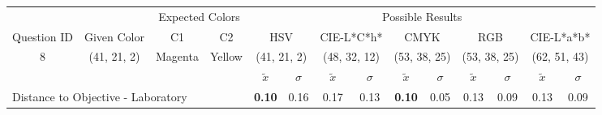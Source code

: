 \begin{table}[H]
  \resizebox{\textwidth}{!} {
  \begin{tabular}{lccccccccccccc}
    \hline
    \multicolumn{1}{c}{}                              &                                      & \multicolumn{2}{c}{Expected Colors}                   & \multicolumn{10}{c}{Possible Results}                                                                                                                                                                                                                                                                                        \\ \cline{3-14}
    \multicolumn{1}{c}{\multirow{-2}{*}{Question ID}} & \multirow{-2}{*}{Given Color}        & C1                       & C2                         & \multicolumn{2}{c}{HSV}                                        & \multicolumn{2}{c}{CIE-L*C*h*}                                 & \multicolumn{2}{c}{CMYK}                                       & \multicolumn{2}{c}{RGB}                                        & \multicolumn{2}{c}{CIE-L*a*b*}                                 \\ \hline
    \multicolumn{1}{c}{8}                             & \cellcolor[HTML]{FF0000}(41, 21, 2) & \multicolumn{1}{c|}{Magenta} & \multicolumn{1}{c|}{Yellow}  & \multicolumn{2}{c|}{\cellcolor[HTML]{FF0000}(41, 21, 2)}      & \multicolumn{2}{c|}{\cellcolor[HTML]{FF6755}(48, 32, 12)}       & \multicolumn{2}{c|}{\cellcolor[HTML]{FF8080}(53, 38, 25)}       & \multicolumn{2}{c|}{\cellcolor[HTML]{FF8080}(53, 38, 25)}       & \multicolumn{2}{c|}{\cellcolor[HTML]{FFA6A6}(62, 51, 43)}       \\ \hline
                                                      & \multicolumn{1}{l}{}                 & \multicolumn{1}{l}{}     & \multicolumn{1}{l}{}       & \multicolumn{1}{c}{$\tilde{x}$} & \multicolumn{1}{c}{$\sigma$} & \multicolumn{1}{c}{$\tilde{x}$} & \multicolumn{1}{c}{$\sigma$} & \multicolumn{1}{c}{$\tilde{x}$} & \multicolumn{1}{c}{$\sigma$} & \multicolumn{1}{c}{$\tilde{x}$} & \multicolumn{1}{c}{$\sigma$} & \multicolumn{1}{c}{$\tilde{x}$} & \multicolumn{1}{c}{$\sigma$} \\ \hline
    \multicolumn{4}{l}{Distance to Objective - Laboratory}                                                                                           & \multicolumn{1}{|c}{\textbf{0.10}}       & \multicolumn{1}{c|}{0.16}    & \multicolumn{1}{|c}{0.17}       & \multicolumn{1}{c|}{0.13}    & \multicolumn{1}{|c}{\textbf{0.10}}       & \multicolumn{1}{c|}{0.05}    & \multicolumn{1}{|c}{0.13}       & \multicolumn{1}{c|}{0.09}    & \multicolumn{1}{|c}{0.13}       & \multicolumn{1}{c|}{0.09}    \\

\end{tabular}}
\end{table}
